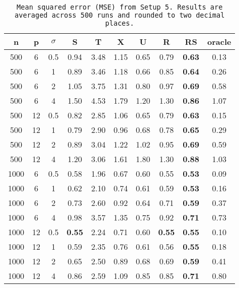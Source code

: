 \begin{table}[ht]
\centering
\begin{tabular}{cccccccccc}
  \hline
n & p & $\sigma$ & S & T & X & U & R & RS & oracle \\ 
  \hline
500 & 6 & 0.5 & 0.94 & 3.48 & 1.15 &  0.65 & 0.79 & \bf 0.63 & 0.13 \\ 
  500 & 6 & 1 & 0.89 & 3.46 & 1.18 &  0.66 & 0.85 & \bf 0.64 & 0.26 \\ 
  500 & 6 & 2 & 1.05 & 3.75 & 1.31 &  0.80 & 0.97 & \bf 0.69 & 0.58 \\ 
  500 & 6 & 4 & 1.50 & 4.53 & 1.79 &  1.20 & 1.30 & \bf 0.86 & 1.07 \\ 
  500 & 12 & 0.5 & 0.82 & 2.85 & 1.06 &  0.65 & 0.79 & \bf 0.63 & 0.15 \\ 
  500 & 12 & 1 & 0.79 & 2.90 & 0.96 &  0.68 & 0.78 & \bf 0.65 & 0.29 \\ 
  500 & 12 & 2 & 0.89 & 3.04 & 1.22 &  1.02 & 0.95 & \bf 0.69 & 0.59 \\ 
  500 & 12 & 4 & 1.20 & 3.06 & 1.61 &  1.80 & 1.30 & \bf 0.88 & 1.03 \\ 
  1000 & 6 & 0.5 & 0.58 & 1.96 & 0.67 &  0.60 & 0.55 & \bf 0.53 & 0.09 \\ 
  1000 & 6 & 1 & 0.62 & 2.10 & 0.74 &  0.61 & 0.59 & \bf 0.53 & 0.16 \\ 
  1000 & 6 & 2 & 0.73 & 2.60 & 0.92 &  0.64 & 0.71 & \bf 0.59 & 0.37 \\ 
  1000 & 6 & 4 & 0.98 & 3.57 & 1.35 &  0.75 & 0.92 & \bf 0.71 & 0.73 \\ 
  1000 & 12 & 0.5 & \bf 0.55 & 2.24 & 0.71 &  0.60 & \bf 0.55 & \bf 0.55 & 0.10 \\ 
  1000 & 12 & 1 & 0.59 & 2.35 & 0.76 &  0.61 & 0.56 & \bf 0.55 & 0.18 \\ 
  1000 & 12 & 2 & 0.65 & 2.50 & 0.89 &  0.68 & 0.69 & \bf 0.59 & 0.41 \\ 
  1000 & 12 & 4 & 0.86 & 2.59 & 1.09 &  0.85 & 0.85 & \bf 0.71 & 0.80 \\ 
   \hline
\end{tabular}
\caption{\tt Mean squared error (MSE) from Setup 5. Results are averaged across 500 runs and rounded to two decimal places.} 
\label{table:setup5}
\end{table}
